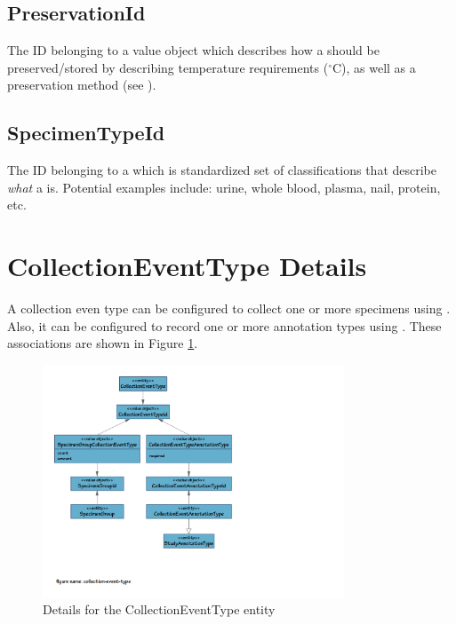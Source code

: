 \subsection*{PreservationId}

The ID belonging to a  value object which describes
how a  should be preserved/stored by describing
temperature requirements ($^\circ$C), as well as a preservation method (see
).

\subsection*{SpecimenTypeId}

The ID belonging to a  which is standardized set of
classifications that describe \emph{what} a  is. Potential
examples include: urine, whole blood, plasma, nail, protein, etc.

\section{CollectionEventType Details}
\label{sec:collection-event-type}

A collection even type can be configured to collect one or more specimens using
. Also, it can be configured to
record one or more annotation types using
. These associations are shown in
Figure \ref{fig:collection-event-type}.

\begin{figure}[h]
  \centering
  \includegraphics[trim={9mm 45mm 96mm 9mm}, clip,
    width=0.8\textwidth]{images/collection-event-type}
  \caption{Details for the CollectionEventType entity}
  \label{fig:collection-event-type}
\end{figure}

